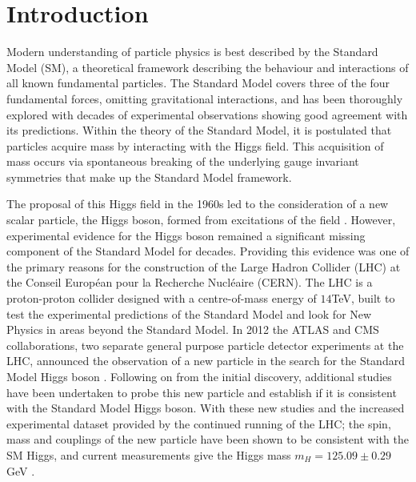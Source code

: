 \chapter{Introduction}
\label{c:intro}

Modern understanding of particle physics is best described by the Standard Model (SM), a theoretical framework describing the behaviour and interactions of all known fundamental particles. The Standard Model covers three of the four fundamental forces, omitting gravitational interactions, and has been thoroughly explored with decades of experimental observations showing good agreement with its predictions. Within the theory of the Standard Model, it is postulated that particles acquire mass by interacting with the Higgs field. This acquisition of mass occurs via spontaneous breaking of the underlying gauge invariant symmetries that make up the Standard Model framework.

The proposal of this Higgs field in the 1960s led to the consideration of a new scalar particle, the Higgs boson, formed from excitations of the field \cite{gauge-boson-mass, higgs-1, higgs-2}. However, experimental evidence for the Higgs boson remained a significant missing component of the Standard Model for decades. Providing this evidence was one of the primary reasons for the construction of the Large Hadron Collider \cite{lhc} (LHC) at the  Conseil Europ\'{e}an pour la Recherche Nucl\'{e}aire (CERN). The LHC is a proton-proton collider designed with a centre-of-mass energy of $14$TeV, built to test the experimental predictions of the Standard Model and look for New Physics in areas beyond the Standard Model. In 2012 the ATLAS and CMS collaborations, two separate general purpose particle detector experiments at the LHC, announced the observation of a new particle in the search for the Standard Model Higgs boson \cite{cmshiggs, atlashiggs}. Following on from the initial discovery, additional studies have been undertaken to probe this new particle and establish if it is consistent with the Standard Model Higgs boson. With these new studies and the increased experimental dataset provided by the continued running of the LHC; the spin, mass and couplings of the new particle have been shown to be consistent with the SM Higgs, and current measurements give the Higgs mass $m_H=125.09\pm0.29$GeV \cite{higgsmeasure}.

